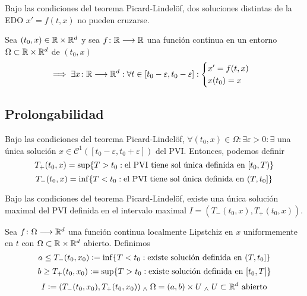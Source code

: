 
\begin{cor}
	Bajo las condiciones del teorema Picard-Lindelöf, dos soluciones distintas de la EDO $x'=f(t,x)$ no pueden cruzarse.
\end{cor}

\begin{teo}
	Sea $(t_0, x) \in \mathbb{R}\times\mathbb{R}^d$ y sea $f \colon \mathbb{R} \longrightarrow \mathbb{R}$ una función continua en un entorno $\Omega \subset \mathbb{R}\times\mathbb{R}^d$ de $(t_0, x)$
	\[\implies \exists x \colon \mathbb{R} \longrightarrow \mathbb{R}^d : \forall t \in [t_0 - \varepsilon, t_0 - \varepsilon] : \begin{cases}
			x' = f(t, x) \\
			x(t_0) = x
		\end{cases}\]
\end{teo}

\subsection{Prolongabilidad}

Bajo las condiciones del teorema Picard-Lindelöf, $\forall (t_0, x) \in \Omega : \exists \varepsilon > 0 : \exists $ una única solución $x \in \mathcal{C}^1([t_0-\varepsilon, t_0+\varepsilon])$ del PVI. Entonces, podemos definir
\[T_+(t_0, x) = \sup\{T > t_0 : \text{el PVI tiene sol única definida en } [t_0, T)\}\]
\[T_-(t_0, x) = \inf\{T < t_0 : \text{el PVI tiene sol única definida en } (T, t_0]\}\]

\begin{teo}
	Bajo las condiciones del teorema Picard-Lindelöf, existe una única solución maximal del PVI definida en el intervalo maximal $I = (T_-(t_0, x), T_+(t_0, x))$.
\end{teo}

Sea $f \colon \Omega \longrightarrow \mathbb{R}^d$ una función continua localmente Lipstchiz en $x$ uniformemente en $t$ con $\Omega\subset \mathbb{R}\times\mathbb{R}^d$ abierto. Definimos
\[a \leq T_-(t_0, x_0) \vcentcolon= \inf\{T < t_0: \text{existe solución definida en }(T, t_0]\}\]
\[b \geq T_+(t_0, x_0) \vcentcolon= \sup\{T > t_0: \text{existe solución definida en }[t_0, T]\}\]
\[I\vcentcolon= (T_-(t_0, x_0), T_+(t_0, x_0)) \; _{\wedge} \; \Omega = (a, b)\times U \; _{\wedge} \; U\subset \mathbb{R}^d \text{ abierto}\]

